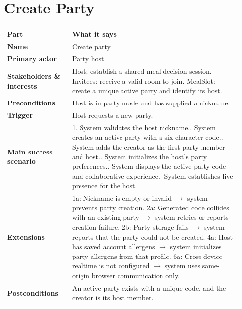 \documentclass[11pt,twocolumn]{article}
\newcommand{\ucheader}{%
\textbf{Part} & \textbf{What it says} \\
\hline
\endhead
\hline
\endfoot
}
\begin{document}
\section{Create Party}
{\footnotesize
\begin{longtable}{@{}p{0.26\linewidth}p{0.68\linewidth}@{}}
\hline
\ucheader
\textbf{Name} & Create party \\
\hline
\textbf{Primary actor} & Party host \\
\hline
\textbf{Stakeholders \& interests} & Host: establish a shared meal-decision session. Invitees: receive a valid room to join. MealSlot: create a unique active party and identify its host. \\
\hline
\textbf{Preconditions} & Host is in party mode and has supplied a nickname. \\
\hline
\textbf{Trigger} & Host requests a new party. \\
\hline
\textbf{Main success scenario} & 1. System validates the host nickname.\newline
2. System creates an active party with a six-character code.\newline
3. System adds the creator as the first party member and host.\newline
4. System initializes the host's party preferences.\newline
5. System displays the active party code and collaborative experience.\newline
6. System establishes live presence for the host. \\
\hline
\textbf{Extensions} & 1a: Nickname is empty or invalid $\rightarrow$ system prevents party creation.\newline
2a: Generated code collides with an existing party $\rightarrow$ system retries or reports creation failure.\newline
2b: Party storage fails $\rightarrow$ system reports that the party could not be created.\newline
4a: Host has saved account allergens $\rightarrow$ system initializes party allergens from that profile.\newline
6a: Cross-device realtime is not configured $\rightarrow$ system uses same-origin browser communication only. \\
\hline
\textbf{Postconditions} & An active party exists with a unique code, and the creator is its host member. \\
\hline
\end{longtable}
}
\end{document}
